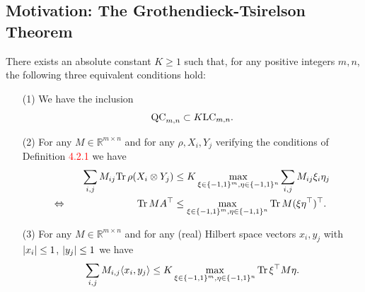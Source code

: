 \frame{\tableofcontents[currentsection]}

\subsection{Motivation: The Grothendieck-Tsirelson Theorem}
\frame{\tableofcontents[currentsubsection]}
	\begin{frame}
		\begin{theo}
			There exists an absolute constant $K\geq 1$ such that, for any positive integers $m,n$, the following three equivalent conditions hold:
			\begin{itemize}
				\item[(1)] We have the inclusion 
					\begin{equation}
						\textup{QC}_{m,n} \subset K\textup{LC}_{m,n}.
					\end{equation}
				\item[(2)] For any $M\in\mathbb{R}^{m\times n}$ and for any $\rho,X_i,Y_j$ verifying the conditions of Definition \textcolor{red}{4.2.1} we have
					\begin{align}
						\sum_{i,j} M_{ij} \textup{Tr} \, {\rho(X_i\otimes Y_j)}  &\leq K \max_{\xi\in\{-1,1\}^m,\eta\in\{-1,1\}^n} \sum_{i,j} M_{ij}\xi_i\eta_j \\
						\Leftrightarrow \hspace{2.5cm} \textup{Tr} \, {MA^\top}  &\leq \max_{\xi\in\{-1,1\}^m,\eta\in\{-1,1\}^n} \textup{Tr} \, {M(\xi\eta^\top)^\top} .
					\end{align}
					\item[(3)] For any $M\in\mathbb{R}^{m\times n}$ and for any (real) Hilbert space vectors $x_i,y_j$ with ${\left|{x_i}\right|}\leq 1$, ${\left|{y_j}\right|}\leq 1$ we have
						\begin{equation}
							\sum_{i,j} M_{i,j}\langle{x_i},{y_j}\rangle \leq K \max_{\xi\in\{-1,1\}^m,\eta\in\{-1,1\}^n} \textup{Tr} \, {\xi^\top M \eta} . \label{eq:G_ineq}
						\end{equation}
			\end{itemize}
		\end{theo}
	\end{frame}

